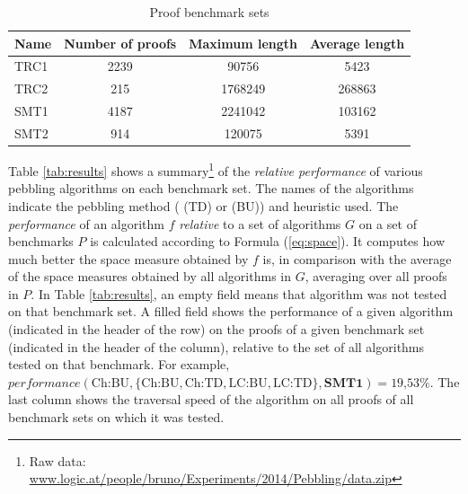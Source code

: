 \documentclass{llncs}
\begin{document}
\begin{table}[tb]
	\centering
	\begin{tabular}{l|c|c|c}
		\textbf{Name} & \textbf{Number of proofs} & \textbf{Maximum length} & \textbf{Average length} \\ \toprule
		TRC1 & 2239 & 90756   & 5423   \\ \hline
		TRC2 & 215	& 1768249 & 268863 \\ \hline
    SMT1 & 4187 & 2241042 & 103162 \\ \hline
    SMT2 & 914  & 120075  & 5391  \\     
	\end{tabular}
	\caption{Proof benchmark sets}
	\label{tab:benchmarks}
\end{table}

Table \ref{tab:results} shows a summary\footnote{Raw data: \url{www.logic.at/people/bruno/Experiments/2014/Pebbling/data.zip}} of the \emph{relative performance} of various pebbling algorithms on each benchmark set. The names of the algorithms indicate the pebbling method ( (TD) or  (BU)) and heuristic used.
The \emph{performance} of an algorithm $f$ \emph{relative} to a set of algorithms $G$ on a set of benchmarks $P$ is calculated according to Formula (\ref{eq:space}). It computes how much better the space measure obtained by $f$ is, in comparison with the average of the space measures obtained by all algorithms in $G$, averaging over all proofs in $P$. In Table \ref{tab:results}, an empty field means that algorithm was not tested on that benchmark set. A filled field shows the performance of a given algorithm (indicated in the header of the row) on the proofs of a given benchmark set (indicated in the header of the column), relative to the set of all algorithms tested on that benchmark. For example, $\mathit{performance}(\textrm{Ch:BU},\{ \textrm{Ch:BU}, \textrm{Ch:TD}, \textrm{LC:BU}, \textrm{LC:TD}\}, \textbf{SMT1}) = \textrm{19,53\%}$. The last column shows the traversal speed of the algorithm on all proofs of all benchmark sets on which it was tested.
\end{document}
